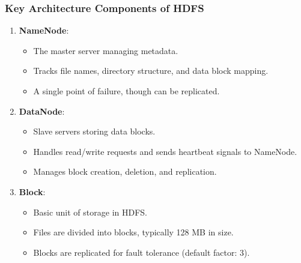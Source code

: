 \documentclass[aspectratio=169]{beamer}
\begin{document}
\begin{frame}[fragile]
    \frametitle{Key Architecture Components of HDFS}
    \begin{enumerate}
        \item \textbf{NameNode}:
        \begin{itemize}
            \item The master server managing metadata.
            \item Tracks file names, directory structure, and data block mapping.
            \item A single point of failure, though can be replicated.
        \end{itemize}
        
        \item \textbf{DataNode}:
        \begin{itemize}
            \item Slave servers storing data blocks.
            \item Handles read/write requests and sends heartbeat signals to NameNode.
            \item Manages block creation, deletion, and replication.
        \end{itemize}
        
        \item \textbf{Block}:
        \begin{itemize}
            \item Basic unit of storage in HDFS.
            \item Files are divided into blocks, typically 128 MB in size.
            \item Blocks are replicated for fault tolerance (default factor: 3).
        \end{itemize}
    \end{enumerate}
\end{frame}
\end{document}
